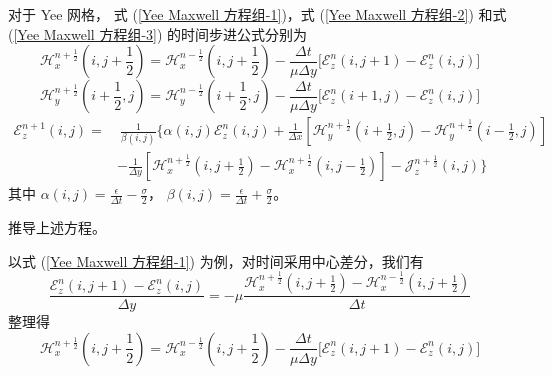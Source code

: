 \begin{theorem}
    对于 Yee 网格，
    式 (\ref{Yee Maxwell 方程组-1})，式 (\ref{Yee Maxwell 方程组-2}) 
    和式 (\ref{Yee Maxwell 方程组-3})
    的时间步进公式分别为
    \begin{equation}
        \mathscr{H}_x^{n+\frac{1}{2}}\left(i,j+\frac{1}{2}\right)=
        \mathscr{H}_x^{n-\frac{1}{2}}\left(i,j+\frac{1}{2}\right)
        -\frac{\Delta t}{\mu \Delta y}\Big[
        \mathscr{E}_z^n(i,j+1)-\mathscr{E}_z^n(i,j)
        \Big]
        \label{Yee 时间步进公式-1}
    \end{equation}
    \begin{equation}
        \mathscr{H}_y^{n+\frac{1}{2}}\left(i+\frac{1}{2},j\right)=
        \mathscr{H}_y^{n-\frac{1}{2}}\left(i+\frac{1}{2},j\right)
        -\frac{\Delta t}{\mu \Delta y}\Big[
        \mathscr{E}_z^n(i+1,j)-\mathscr{E}_z^n(i,j)
        \Big]
        \label{Yee 时间步进公式-2}
    \end{equation}
    \begin{equation}
        \begin{aligned}
            \mathscr{E}_z^{n+1}(i,j)=&\ \frac{1}{\beta(i,j)}
            \Bigg\{\alpha(i,j)\mathscr{E}_z^n(i,j)+\frac{1}{\Delta x}\left[
                \mathscr{H}_y^{n+\frac{1}{2}}\left(i+\frac{1}{2},j\right)
                -\mathscr{H}_y^{n+\frac{1}{2}}\left(i-\frac{1}{2},j\right)
            \right]\\
            &-\frac{1}{\Delta y}
            \left[\mathscr{H}_x^{n+\frac{1}{2}}\left(i,j+\frac{1}{2}\right)
            -\mathscr{H}_x^{n+\frac{1}{2}}\left(i,j-\frac{1}{2}\right)
            \right]-\mathscr{J}_z^{n+\frac{1}{2}}(i,j)
            \Bigg\}
        \end{aligned}
        \label{Yee 时间步进公式-3}
    \end{equation}
    其中 $\alpha(i,j)=\frac{\epsilon}{\Delta t}-\frac{\sigma}{2}$，
    $\beta(i,j)=\frac{\epsilon}{\Delta t}+\frac{\sigma}{2}$。
\end{theorem}

\begin{exercise}
    推导上述方程。
\end{exercise}

\begin{solution}
    以式 (\ref{Yee Maxwell 方程组-1}) 为例，对时间采用中心差分，我们有
    \begin{equation*}
        \frac{\mathscr{E}_z^n(i,j+1)-\mathscr{E}_z^n(i,j)}{\Delta y}
        =-\mu \frac{\mathscr{H}_x^{n+\frac{1}{2}}\left(i,j+\frac{1}{2}\right)
        -\mathscr{H}_x^{n-\frac{1}{2}}\left(i,j+\frac{1}{2}\right)}{\Delta t}
    \end{equation*}
    整理得
    \begin{equation*}
        \mathscr{H}_x^{n+\frac{1}{2}}\left(i,j+\frac{1}{2}\right)=
        \mathscr{H}_x^{n-\frac{1}{2}}\left(i,j+\frac{1}{2}\right)
        -\frac{\Delta t}{\mu \Delta y}\Big[
        \mathscr{E}_z^n(i,j+1)-\mathscr{E}_z^n(i,j)
        \Big]
    \end{equation*}
\end{solution}

